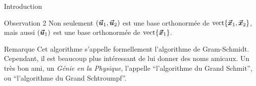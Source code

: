 \documentclass[a4paper]{article}
\begin{document}
\begin{parag}{Introduction}
    \begin{subparag}{Observation 2}
        Non seulement $\left(\bvec{u}_1, \bvec{u}_2\right)$ est une base orthonormée de $\vect\left\{\bvec{x}_1, \bvec{x}_2\right\}$, mais aussi $\left(\bvec{u}_1\right)$ est une base orthonormée de $\vect\left\{\bvec{x}_1\right\}$.
    \end{subparag}

    \begin{subparag}{Remarque}
        Cet algorithme s'appelle formellement l'algorithme de Gram-Schmidt. Cependant, il est beaucoup plus intéressant de lui donner des noms amicaux. Un très bon ami, un \textit{Génie en la Physique}, l'appelle ``l'algorithme du Grand Schmit'', ou ``l'algorithme du Grand Schtroumpf''.
    \end{subparag}
\end{parag}
\end{document}

